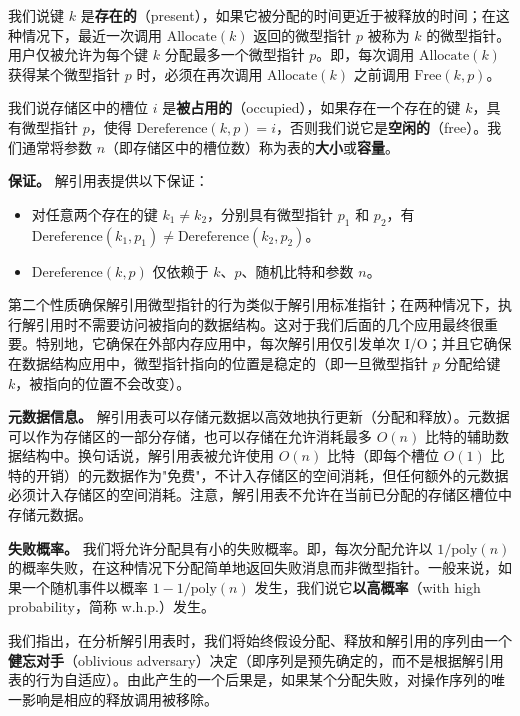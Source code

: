 \documentclass[12pt,a4paper]{ctexart}
\theoremstyle{remark}
\begin{document}
我们说键 $k$ 是\textbf{存在的}（present），如果它被分配的时间更近于被释放的时间；在这种情况下，最近一次调用 $\text{Allocate}(k)$ 返回的微型指针 $p$ 被称为 $k$ 的微型指针。用户仅被允许为每个键 $k$ 分配最多一个微型指针 $p$。即，每次调用 $\text{Allocate}(k)$ 获得某个微型指针 $p$ 时，必须在再次调用 $\text{Allocate}(k)$ 之前调用 $\text{Free}(k,p)$。

我们说存储区中的槽位 $i$ 是\textbf{被占用的}（occupied），如果存在一个存在的键 $k$，具有微型指针 $p$，使得 $\text{Dereference}(k,p)=i$，否则我们说它是\textbf{空闲的}（free）。我们通常将参数 $n$（即存储区中的槽位数）称为表的\textbf{大小}或\textbf{容量}。

\textbf{保证。} 解引用表提供以下保证：

\begin{itemize}
\item 对任意两个存在的键 $k_1\neq k_2$，分别具有微型指针 $p_1$ 和 $p_2$，有 $\text{Dereference}(k_1,p_1)\neq\text{Dereference}(k_2,p_2)$。
\item $\text{Dereference}(k,p)$ 仅依赖于 $k$、$p$、随机比特和参数 $n$。
\end{itemize}

第二个性质确保解引用微型指针的行为类似于解引用标准指针；在两种情况下，执行解引用时不需要访问被指向的数据结构。这对于我们后面的几个应用最终很重要。特别地，它确保在外部内存应用中，每次解引用仅引发单次 I/O；并且它确保在数据结构应用中，微型指针指向的位置是稳定的（即一旦微型指针 $p$ 分配给键 $k$，被指向的位置不会改变）。

\textbf{元数据信息。} 解引用表可以存储元数据以高效地执行更新（分配和释放）。元数据可以作为存储区的一部分存储，也可以存储在允许消耗最多 $O(n)$ 比特的辅助数据结构中。换句话说，解引用表被允许使用 $O(n)$ 比特（即每个槽位 $O(1)$ 比特的开销）的元数据作为"免费"，不计入存储区的空间消耗，但任何额外的元数据必须计入存储区的空间消耗。注意，解引用表不允许在当前已分配的存储区槽位中存储元数据。

\textbf{失败概率。} 我们将允许分配具有小的失败概率。即，每次分配允许以 $1/\text{poly}(n)$ 的概率失败，在这种情况下分配简单地返回失败消息而非微型指针。一般来说，如果一个随机事件以概率 $1-1/\text{poly}(n)$ 发生，我们说它\textbf{以高概率}（with high probability，简称 w.h.p.）发生。

我们指出，在分析解引用表时，我们将始终假设分配、释放和解引用的序列由一个\textbf{健忘对手}（oblivious adversary）决定（即序列是预先确定的，而不是根据解引用表的行为自适应）。由此产生的一个后果是，如果某个分配失败，对操作序列的唯一影响是相应的释放调用被移除。
\end{document}
